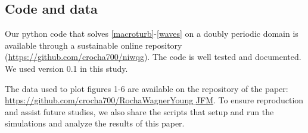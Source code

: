 \documentclass{jfm}
\begin{document}

\subsection{Code and data}
Our python code that solves \eqref{macroturb}-\eqref{waves} on a doubly periodic domain
is available through a sustainable online repository
(\href{https://github.com/crocha700/niwqg}{https://github.com/crocha700/niwqg}).
The code is well tested and documented. We used version 0.1 in this study.

The data used to plot figures 1-6 are available on the repository of the paper:
\href{https://github.com/crocha700/RochaWagnerYoung_JFM}{https://github.com/crocha700/RochaWagnerYoung$\_$JFM}.
To ensure  reproduction and assist future studies, we also share the scripts that
setup and run the simulations and analyze the results of this paper.



\end{document}
